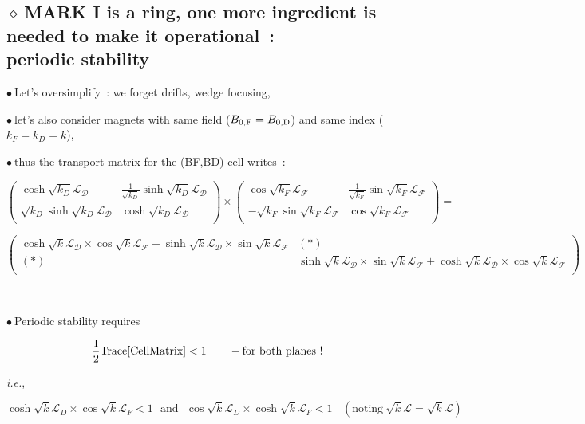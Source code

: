 \documentclass[12pt]{article}
\newcommand{\ie}{\textsl{i.e.}}
\newcommand{\nib}{\noindent \ensuremath{\bullet~}}
\newcommand{\nid}{\noindent \ensuremath{\diamond~}}
\newcommand{\blue}{\color{blue}}
\begin{document}
{\fontsize{17}{30} \selectfont

\subsection*{\LARGE \nid MARK I is a ring, one more ingredient is needed to make it operational~: \\ periodic stability}

\nib Let's oversimplify~: we forget drifts, wedge focusing, 



\nib let's also consider  magnets with same field ($B_{\rm 0,F}=B_{\rm 0,D}$) and same index ($k_F = k_D = k$), 



\nib thus the transport matrix for the  (BF,BD) cell writes~:



$$
\left(
\begin{array}{cc} 
 \cosh \sqrt{k_D} \mathcal{L_D} & \frac{\textstyle{1}}{\textstyle{\sqrt{k_D}}}  \sinh \sqrt{k_D}  \mathcal{L_D}   \\[-.4000ex]
 \sqrt{k_D} \sinh \sqrt{k_D}  \mathcal{L_D} &   \cosh \sqrt{k_D}  \mathcal{L_D}  \\[-.4000ex]
\end{array} \right)
\times
\left(
\begin{array}{cc} 
 \cos \sqrt{k_F} \mathcal{L_F} & \frac{\textstyle{1}}{\textstyle{\sqrt{k_F}}}  \sin \sqrt{k_F}  \mathcal{L_F}   \\[-.4000ex]
 -\sqrt{k_F} \sin \sqrt{k_F}  \mathcal{L_F} &   \cos \sqrt{k_F}  \mathcal{L_F}  \\[-.4000ex]
\end{array} \right)
=
$$



$$
\left(
\begin{array}{cc} 
 \cosh \sqrt{k} \mathcal{L_D} \times  \cos \sqrt{k} \mathcal{L_F} -  \sinh \sqrt{k}  \mathcal{L_D} \times \sin \sqrt{k}  \mathcal{L_F}& (*)   \\[-.4000ex]
 (*) &  \sinh \sqrt{k} \mathcal{L_D}\times  \sin \sqrt{k}  \mathcal{L_F} +   \cosh \sqrt{k}  \mathcal{L_D}\times  \cos \sqrt{k}  \mathcal{L_F}  \\[-.4000ex]
\end{array} \right)
$$

~

\nib Periodic stability requires 

$$\rm \frac{\textstyle{1}}{\textstyle{2}} Trace[Cell Matrix] < 1 \ \ \ \ \ \ - \textrm{for both planes !}$$

\ie,

{\blue \LARGE
$$  \cosh \sqrt{k} \mathcal{L}_D \times  \cos \sqrt{k} \mathcal{L}_F <1 \ \ \ \textrm{and} \ \ \  \cos \sqrt{k} \mathcal{L}_D \times  \cosh \sqrt{k} \mathcal{L}_F <1 \ \ \ \  (\textrm{noting} \  \sqrt{k} \mathcal{L} = \sqrt{k}\mathcal{L})$$
}


}%
\end{document}
